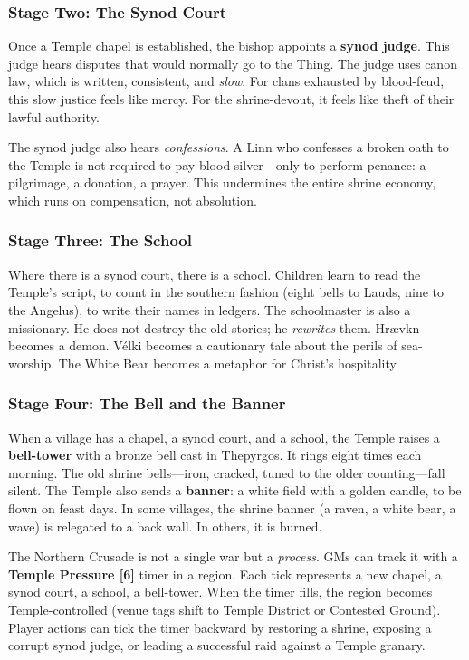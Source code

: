 \documentclass[11pt]{article}
\begin{document}
\subsubsection{Stage Two: The Synod Court}

Once a Temple chapel is established, the bishop appoints a \textbf{synod judge}. This judge hears disputes that would normally go to the Thing. The judge uses canon law, which is written, consistent, and \textit{slow}. For clans exhausted by blood-feud, this slow justice feels like mercy. For the shrine-devout, it feels like theft of their lawful authority.

The synod judge also hears \textit{confessions}. A Linn who confesses a broken oath to the Temple is not required to pay blood-silver---only to perform penance: a pilgrimage, a donation, a prayer. This undermines the entire shrine economy, which runs on compensation, not absolution.

\subsubsection{Stage Three: The School}

Where there is a synod court, there is a school. Children learn to read the Temple's script, to count in the southern fashion (eight bells to Lauds, nine to the Angelus), to write their names in ledgers. The schoolmaster is also a missionary. He does not destroy the old stories; he \textit{rewrites} them. Hrævkn becomes a demon. Vélki becomes a cautionary tale about the perils of sea-worship. The White Bear becomes a metaphor for Christ's hospitality.

\subsubsection{Stage Four: The Bell and the Banner}

When a village has a chapel, a synod court, and a school, the Temple raises a \textbf{bell-tower} with a bronze bell cast in Thepyrgos. It rings eight times each morning. The old shrine bells---iron, cracked, tuned to the older counting---fall silent. The Temple also sends a \textbf{banner}: a white field with a golden candle, to be flown on feast days. In some villages, the shrine banner (a raven, a white bear, a wave) is relegated to a back wall. In others, it is burned.

\begin{mechanicbox}
The Northern Crusade is not a single war but a \textit{process}. GMs can track it with a \textbf{Temple Pressure [6]} timer in a region. Each tick represents a new chapel, a synod court, a school, a bell-tower. When the timer fills, the region becomes Temple-controlled (venue tags shift to Temple District or Contested Ground). Player actions can tick the timer backward by restoring a shrine, exposing a corrupt synod judge, or leading a successful raid against a Temple granary.
\end{mechanicbox}
\end{document}
